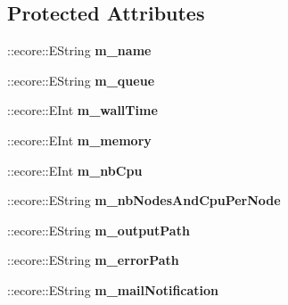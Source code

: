 \subsection*{Protected Attributes}
\begin{DoxyCompactItemize}
\item 
\hypertarget{classTMS__Data_1_1SubmitOptions_a9a4da61ae62ad8c506bca0209cea379a}{
::ecore::EString {\bfseries m\_\-name}}
\label{classTMS__Data_1_1SubmitOptions_a9a4da61ae62ad8c506bca0209cea379a}

\item 
\hypertarget{classTMS__Data_1_1SubmitOptions_ad3444d43592e50f065436736fe5f4cb2}{
::ecore::EString {\bfseries m\_\-queue}}
\label{classTMS__Data_1_1SubmitOptions_ad3444d43592e50f065436736fe5f4cb2}

\item 
\hypertarget{classTMS__Data_1_1SubmitOptions_abfa3f5ae5295f22aaf60d8cacc3578e4}{
::ecore::EInt {\bfseries m\_\-wallTime}}
\label{classTMS__Data_1_1SubmitOptions_abfa3f5ae5295f22aaf60d8cacc3578e4}

\item 
\hypertarget{classTMS__Data_1_1SubmitOptions_af79c35ce0d26fc2c5584eb9fd369071a}{
::ecore::EInt {\bfseries m\_\-memory}}
\label{classTMS__Data_1_1SubmitOptions_af79c35ce0d26fc2c5584eb9fd369071a}

\item 
\hypertarget{classTMS__Data_1_1SubmitOptions_a986c0e7f552cd366f6e28ac57a2718a1}{
::ecore::EInt {\bfseries m\_\-nbCpu}}
\label{classTMS__Data_1_1SubmitOptions_a986c0e7f552cd366f6e28ac57a2718a1}

\item 
\hypertarget{classTMS__Data_1_1SubmitOptions_a542d1dfaef2695a1700545e188a5ef6b}{
::ecore::EString {\bfseries m\_\-nbNodesAndCpuPerNode}}
\label{classTMS__Data_1_1SubmitOptions_a542d1dfaef2695a1700545e188a5ef6b}

\item 
\hypertarget{classTMS__Data_1_1SubmitOptions_af88a84afbf590414937e6e2e0a3770a2}{
::ecore::EString {\bfseries m\_\-outputPath}}
\label{classTMS__Data_1_1SubmitOptions_af88a84afbf590414937e6e2e0a3770a2}

\item 
\hypertarget{classTMS__Data_1_1SubmitOptions_a77c31f37136920f6538b50d9af96c588}{
::ecore::EString {\bfseries m\_\-errorPath}}
\label{classTMS__Data_1_1SubmitOptions_a77c31f37136920f6538b50d9af96c588}

\item 
\hypertarget{classTMS__Data_1_1SubmitOptions_a80c3554fe09a08d8f5be3eb9bb839d79}{
::ecore::EString {\bfseries m\_\-mailNotification}}
\label{classTMS__Data_1_1SubmitOptions_a80c3554fe09a08d8f5be3eb9bb839d79}


\end{DoxyCompactItemize}
